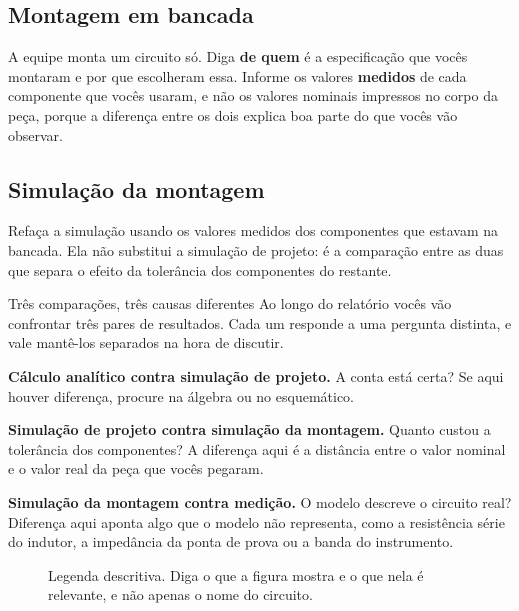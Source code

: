 \documentclass[11pt,a4paper]{article}
\begin{document}
\subsection{Montagem em bancada}

A equipe monta um circuito só. Diga \textbf{de quem} é a especificação que vocês montaram e
por que escolheram essa. Informe os valores \textbf{medidos} de cada componente que vocês
usaram, e não os valores nominais impressos no corpo da peça, porque a diferença entre os
dois explica boa parte do que vocês vão observar.

\subsection{Simulação da montagem}

Refaça a simulação usando os valores medidos dos componentes que estavam na bancada. Ela
não substitui a simulação de projeto: é a comparação entre as duas que separa o efeito da
tolerância dos componentes do restante.

\begin{nota}{Três comparações, três causas diferentes}
Ao longo do relatório vocês vão confrontar três pares de resultados. Cada um responde a uma
pergunta distinta, e vale mantê-los separados na hora de discutir.

\smallskip
\textbf{Cálculo analítico contra simulação de projeto.} A conta está certa? Se aqui houver
diferença, procure na álgebra ou no esquemático.

\smallskip
\textbf{Simulação de projeto contra simulação da montagem.} Quanto custou a tolerância dos
componentes? A diferença aqui é a distância entre o valor nominal e o valor real da peça
que vocês pegaram.

\smallskip
\textbf{Simulação da montagem contra medição.} O modelo descreve o circuito real? Diferença
aqui aponta algo que o modelo não representa, como a resistência série do indutor, a
impedância da ponta de prova ou a banda do instrumento.
\end{nota}

\begin{figure}[htb]
\centering
\caption{Legenda descritiva. Diga o que a figura mostra e o que nela é relevante, e não
apenas o nome do circuito.}
\label{fig:exemplo}
\end{figure}
\end{document}
